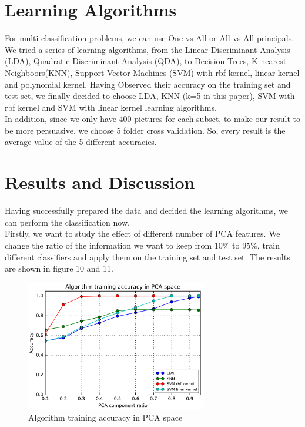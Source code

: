 \documentclass[11pt,letterpaper]{article}
\begin{document}
\section{Learning Algorithms}
For multi-classification problems, we can use One-vs-All or All-vs-All principals. We tried a series of learning algorithms, from the Linear Discriminant Analysis (LDA), Quadratic Discriminant Analysis (QDA), to Decision Trees, K-nearest Neighboors(KNN), Support Vector Machines (SVM) with rbf kernel, linear kernel and polynomial kernel. Having Observed their accuracy on the training set and test set, we finally decided to choose LDA, KNN (k=5 in this paper), SVM with rbf kernel and SVM with linear kernel learning algorithms.\\

In addition, since we only have 400 pictures for each subset, to make our result to be more persuasive, we choose 5 folder cross validation. So, every result is the average value of the 5 different accuracies.\\

\section{Results and Discussion}

Having successfully prepared the data and decided the learning algorithms, we can perform the classification now. \\

Firstly, we want to study the effect of different number of PCA features. We change the ratio of the information we want to keep from $10\%$ to $95\%$, train different classifiers and apply them on the training set and test set. The results are shown in figure 10 and 11.\\

\begin{figure}[H]
\centering
\includegraphics[width=79mm]{little_total_train.png}
\caption{Algorithm training accuracy in PCA space}
\label{train.lable}
\end{figure}
\end{document}
